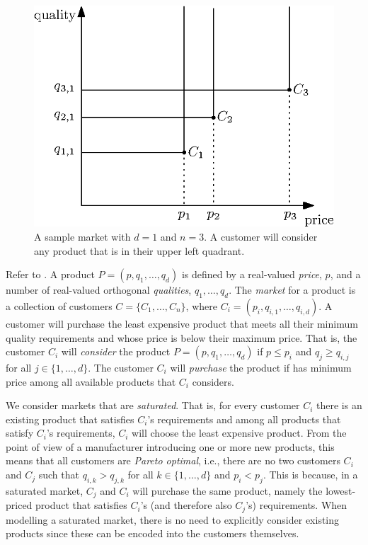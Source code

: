 \documentclass[lotsofwhite]{patmorin}
\begin{document}
\begin{figure}
  \begin{center}
    \includegraphics{intro}
  \end{center}
  \caption{A sample market with $d=1$ and $n=3$. A customer will consider
           any product that is in their upper left quadrant.}
\end{figure}

Refer to .  A product $P=(p,q_1,\ldots,q_d)$ is defined
by a real-valued \emph{price}, $p$, and a number of real-valued
orthogonal \emph{qualities}, $q_1,\ldots,q_d$.  The \emph{market} for
a product is a collection of customers $C=\{C_1,\ldots,C_n\}$, where
$C_i=(p_i,q_{i,1},\ldots,q_{i,d})$.  A customer will purchase the least
expensive product that meets all their minimum quality requirements and
whose price is below their maximum price.  That is, the customer $C_i$
will \emph{consider} the product $P=(p,q_1,\ldots,q_d)$ if $p \le p_i$
and $q_j \ge q_{i,j}$ for all $j\in\{1,\ldots,d\}$.  The customer $C_i$
will \emph{purchase} the product if has minimum price among all available
products that $C_i$ considers.

We consider markets that are \emph{saturated}.  That is, for every customer
$C_i$ there is an existing product that satisfies $C_i$'s
requirements and among all products that satisfy $C_i$'s requirements,
$C_i$ will choose the least expensive product.  From the point of view of a
manufacturer introducing one or more new products, this means that all
customers are \emph{Pareto optimal}, i.e., there are no two customers $C_i$
and $C_j$ such that $q_{i,k} > q_{j,k}$ for all $k\in\{1,\ldots,d\}$ and
$p_i < p_j$.  This is because, in a saturated market, $C_j$ and $C_i$ will
purchase the same product, namely the lowest-priced product that satisfies
$C_i$'s (and therefore also $C_j$'s) requirements.  When modelling a
saturated market, there is no need to explicitly consider existing products
since these can be encoded into the customers themselves.
\end{document}
